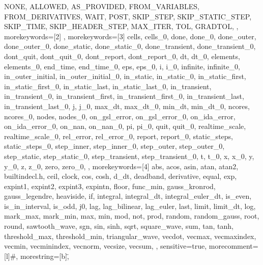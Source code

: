{{      NONE,
      ALLOWED,
      AS_PROVIDED,
      FROM_VARIABLES,
      FROM_DERIVATIVES,
      WAIT,
      POST,
      SKIP_STEP,
      SKIP_STATIC_STEP,
      SKIP_TIME,
      SKIP_HEADER_STEP,
      MAX_ITER,
      TOL,
      GRADTOL,
},
morekeywords={[2]
},
morekeywords={[3]
      cells,
      cells_0,
      done,
      done_0,
      done_outer,
      done_outer_0,
      done_static,
      done_static_0,
      done_transient,
      done_transient_0,
      dont_quit,
      dont_quit_0,
      dont_report,
      dont_report_0,
      dt,
      dt_0,
      elements,
      elements_0,
      end_time,
      end_time_0,
      eps,
      eps_0,
      i,
      i_0,
      infinite,
      infinite_0,
      in_outer_initial,
      in_outer_initial_0,
      in_static,
      in_static_0,
      in_static_first,
      in_static_first_0,
      in_static_last,
      in_static_last_0,
      in_transient,
      in_transient_0,
      in_transient_first,
      in_transient_first_0,
      in_transient_last,
      in_transient_last_0,
      j,
      j_0,
      max_dt,
      max_dt_0,
      min_dt,
      min_dt_0,
      ncores,
      ncores_0,
      nodes,
      nodes_0,
      on_gsl_error,
      on_gsl_error_0,
      on_ida_error,
      on_ida_error_0,
      on_nan,
      on_nan_0,
      pi,
      pi_0,
      quit,
      quit_0,
      realtime_scale,
      realtime_scale_0,
      rel_error,
      rel_error_0,
      report,
      report_0,
      static_steps,
      static_steps_0,
      step_inner,
      step_inner_0,
      step_outer,
      step_outer_0,
      step_static,
      step_static_0,
      step_transient,
      step_transient_0,
      t,
      t_0,
      x,
      x_0,
      y,
      y_0,
      z,
      z_0,
      zero,
      zero_0,
},
morekeywords={[4]
      abs,
      acos,
      asin,
      atan,
      atan2,
      builtindecl.h,
      ceil,
      clock,
      cos,
      cosh,
      d_dt,
      deadband,
      derivative,
      equal,
      exp,
      expint1,
      expint2,
      expint3,
      expintn,
      floor,
      func_min,
      gauss_kronrod,
      gauss_legendre,
      heaviside,
      if,
      integral,
      integral_dt,
      integral_euler_dt,
      is_even,
      is_in_interval,
      is_odd,
      j0,
      lag,
      lag_bilinear,
      lag_euler,
      last,
      limit,
      limit_dt,
      log,
      mark_max,
      mark_min,
      max,
      min,
      mod,
      not,
      prod,
      random,
      random_gauss,
      root,
      round,
      sawtooth_wave,
      sgn,
      sin,
      sinh,
      sqrt,
      square_wave,
      sum,
      tan,
      tanh,
      threshold_max,
      threshold_min,
      triangular_wave,
      vecdot,
      vecmax,
      vecmaxindex,
      vecmin,
      vecminindex,
      vecnorm,
      vecsize,
      vecsum,
},
sensitive=true,
morecomment=[l]{\#},
morestring=[b]\",
}
